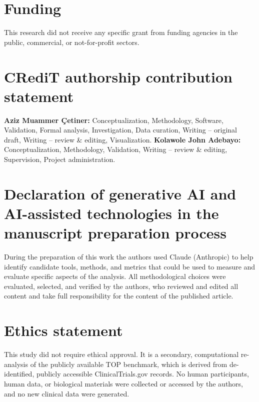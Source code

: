 \documentclass[a4paper,fleqn]{cas-sc}
\begin{document}
\section*{Funding}
This research did not receive any specific grant from funding agencies in the public, commercial, or not-for-profit sectors.

\section*{CRediT authorship contribution statement}
\textbf{Aziz Muammer Çetiner:} Conceptualization, Methodology, Software, Validation, Formal analysis, Investigation, Data curation, Writing -- original draft, Writing -- review \& editing, Visualization.
\textbf{Kolawole John Adebayo:} Conceptualization, Methodology, Validation, Writing -- review \& editing, Supervision, Project administration.

\section*{Declaration of generative AI and AI-assisted technologies in the manuscript preparation process}
During the preparation of this work the authors used Claude (Anthropic) to help identify candidate tools, methods, and metrics that could be used to measure and evaluate specific aspects of the analysis. All methodological choices were evaluated, selected, and verified by the authors, who reviewed and edited all content and take full responsibility for the content of the published article.

\section*{Ethics statement}
This study did not require ethical approval. It is a secondary, computational re-analysis of the publicly available TOP benchmark, which is derived from de-identified, publicly accessible ClinicalTrials.gov records. No human participants, human data, or biological materials were collected or accessed by the authors, and no new clinical data were generated.


%

\end{document}
